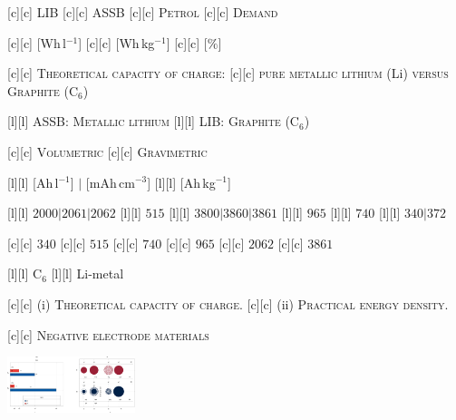 [c][c] {\scriptsize LIB}
[c][c] {\scriptsize ASSB}
[c][c] {\scriptsize \textsc{Petrol}}
[c][c] {\scriptsize \textsc{Demand}}

[c][c] {\tiny [Wh\,l$^{-1}$]}
[c][c] {\tiny [Wh\,kg$^{-1}$]}
[c][c] {\tiny [$\%$]}

[c][c]  {\scriptsize \textsc{Theoretical capacity of charge}:}
[c][c] {\scriptsize
	\textsc{pure} \textsc{metallic lithium} (Li)
	\textsc{versus Graphite (C$_{6}$)}}


[l][l] {\tiny ASSB: \textsc{Metallic lithium}}
[l][l] {\tiny LIB: \textsc{Graphite} (C$_{6}$)}

[c][c] {\tiny \textsc{Volumetric}}
[c][c] {\tiny \textsc{Gravimetric}}

[l][l] {\tiny [Ah\,l$^{-1}$] $|$ [mAh\,cm$^{-3}$]}
[l][l] {\tiny [Ah\,kg$^{-1}$]}

[l][l] {\tiny $2000 | 2061 | 2062$}
[l][l] {\tiny $515$}
[l][l] {\tiny $3800 | 3860 | 3861$}
[l][l] {\tiny $965$}
[l][l] {\tiny $740$}
[l][l] {\tiny $340 | 372$}

[c][c] {\tiny $340$}
[c][c] {\tiny $515$}
[c][c] {\tiny $740$}
[c][c] {\tiny $965$}
[c][c] {\tiny $2062$}
[c][c] {\tiny $3861$}

[l][l] {\tiny C$_{6}$}
[l][l] {\tiny \color{black} Li-metal \color{black}}

[c][c]  {\scriptsize (i) \textsc{Theoretical capacity of charge.}}
[c][c] {\scriptsize (ii) \textsc{Practical energy density.}}

[c][c] {\tiny \textsc{Negative electrode materials}}

\includegraphics[width=0.28\textwidth]{energydensity.eps}